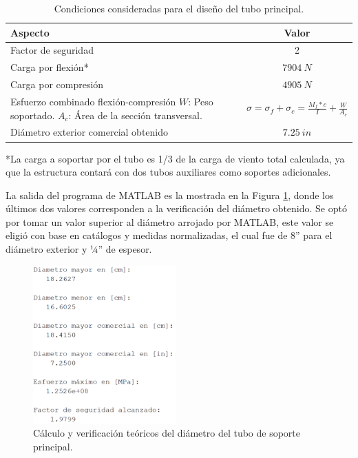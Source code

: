 \begin{table}[H]
  \centering
  \caption{Condiciones consideradas para el diseño del tubo principal.}
    \begin{tabular}{|p{18.355em}|c|}
    \hline
    \textbf{Aspecto} & \textbf{Valor} \\
    \hline \hline
    Factor de seguridad & 2 \\
    \hline
    Carga por flexión* & $ 7904\ N $ \\
    \hline
    Carga por compresión & $ 4905\ N $ \\
    \hline
    Esfuerzo combinado flexión-compresión\newline{} $ W $: Peso soportado.\newline{} $ A_c $: Área de la sección transversal. & $ \sigma= \sigma_f+ \sigma_c= \frac{M_f*c}{I}+\frac{W}{A_c} $ \\
    \hline
    Diámetro exterior comercial obtenido & $ 7.25\ in $ \\
    \hline
    \end{tabular}%
  \label{tab:esfuerzo_tubo}%
\end{table}%
*La carga a soportar por el tubo es 1/3 de la carga de viento total calculada, ya que la estructura contará con dos tubos auxiliares como soportes adicionales.

La salida del programa de MATLAB es la mostrada en la Figura \ref{fig:tal_extra}, donde los últimos dos valores corresponden a la verificación del diámetro obtenido. Se optó por tomar un valor superior al diámetro arrojado por MATLAB, este valor se eligió con base en catálogos y medidas normalizadas, el cual fue de 8” para el diámetro exterior y ¼” de espesor.

\begin{figure}[H]
	\centering
	\includegraphics[width=5.5cm]{imagenes/tal_extra}
	\caption{Cálculo y verificación teóricos del diámetro del tubo de soporte principal.}
	\label{fig:tal_extra}
\end{figure}

